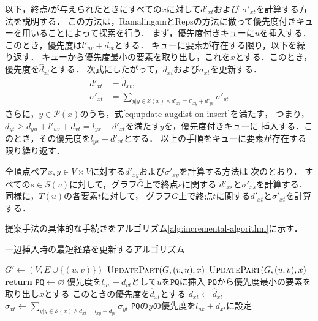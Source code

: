 以下，終点$t$が与えられたときにすべての$x$に対して$d'_{xt}$および
$\sigma'_{xt}$を計算する方法を説明する．
この方法は，RamalingamとRepsの方法に倣って優先度付きキューを用いることによって探索を行う．
まず，優先度付きキューに$u$を挿入する．このとき，優先度は$l'_{uv}+d_{vt}$とする．
キューに要素が存在する限り，以下を繰り返す．
キューから優先度最小の要素を取り出し，これを$x$とする．このとき，
優先度を$\hat{d}_{xt}$とする．
次式にしたがって，$d_{xt}$および$\sigma_{xt}$を更新する．
\begin{equation*}
  \begin{aligned}
    d'_{xt}&=\hat{d}_{xt},\\
    \sigma'_{xt}&=\sum_{y|y\in\mathcal{S}(x)\land d'_{xt}=l'_{xy}+d'_{yt}}\sigma'_{yt}
  \end{aligned}
\end{equation*}
さらに，$y\in\mathcal{P}(x)$のうち，式\eqref{eq:update-augdist-on-insert}を満たす，
つまり，$d_{yt}\geq d_{yu}+l'_{uv}+d_{vt}=l_{yx}+d'_{xt}$を満たす$y$を，優先度付きキューに
挿入する．このとき，その優先度を$l_{yx}+d'_{xt}$とする．
以上の手順をキューに要素が存在する限り繰り返す．

全頂点ペア$x,y\in V\times V$に対する$d'_{xy}$および$\sigma'_{xy}$を計算する方法は
次のとおり．
すべての$s\in S(v)$に対して，グラフ$\bar{G}$上で終点$s$に関する
$d'_{xs}$と$\sigma'_{xs}$を計算する．
同様に，$T(u)$の各要素$t$に対して，
グラフ$G$上で終点$t$に関する$d'_{xt}$と$\sigma'_{xt}$を計算する．

提案手法の具体的な手続きをアルゴリズム\ref{alg:incremental-algorithm}に示す．

\begin{algorithm}[tbp]
  \caption{一辺挿入時の最短経路を更新するアルゴリズム}
  \label{alg:incremental-algorithm}
  \begin{multicols}{2}
    \begin{algorithmic}[1]\small
      \State $G'\gets (V,E\cup\{(u,v)\})$
      \State $\textproc{UpdatePart}(\bar{G},(v,u),x)$
      \EndFor
      \State $\textproc{UpdatePart}(G,(u,v),x)$
      \EndFor
      \EndProcedure
      \vfill\null
      \columnbreak
      \State \textbf{return}
      \EndIf
      \State $\texttt{PQ}\gets\varnothing$
      \State 優先度を$l_{uv}+d_{vt}$として$u$を$\texttt{PQ}$に挿入
      \State $\texttt{PQ}$から優先度最小の要素を取り出し$x$とする
      \State このときの優先度を$\hat{d}_{xt}$とする
      \State $d_{xt}\gets\hat{d}_{xt}$
      \State $\sigma_{xt}\gets\sum_{y|y\in\mathcal{S}(x)\land d_{xt}=l_{xy}+d_{yt}}\sigma_{yt}$
      \State \texttt{PQ}の$y$の優先度を$l_{yx}+d_{xt}$に設定
      \EndIf
      \EndFor
      \EndWhile
      \EndProcedure
    \end{algorithmic}
  \end{multicols}
\end{algorithm}

